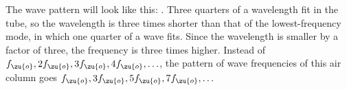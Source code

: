 The wave pattern will look like this: .
Three quarters of a wavelength fit in the tube, so the
wavelength is three times shorter than that of the lowest-frequency
mode, in which one quarter of a wave fits. Since the wavelength is
smaller by a factor of three, the frequency is three times higher.
Instead of $f_\zu{o}, 2f_\zu{o}, 3f_\zu{o}, 4f_\zu{o}, \ldots$, the pattern of wave frequencies of
this air column goes $f_\zu{o}, 3f_\zu{o}, 5f_\zu{o}, 7f_\zu{o}, \ldots$



